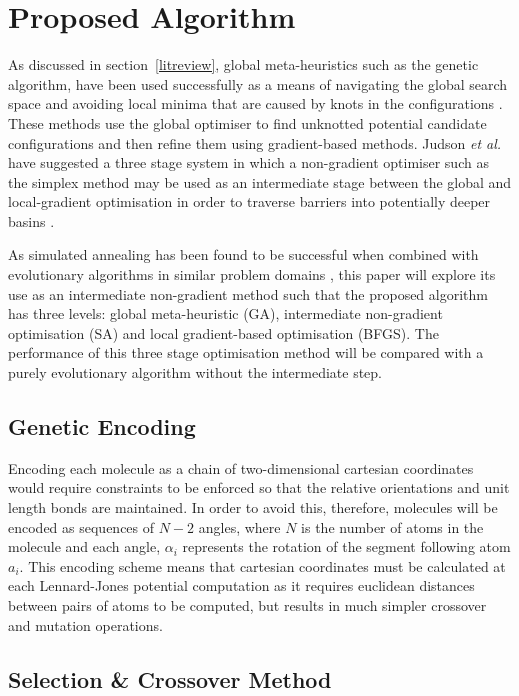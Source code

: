 \documentclass{article}
\begin{document}
\section{Proposed Algorithm} \label{proposed}

As discussed in section~\ref{litreview}, global meta-heuristics such as the
genetic algorithm, have been used successfully as a means of navigating the
global search space and avoiding local minima that are caused by knots in the
configurations \cite{PULLAN1998331, doi:10.1002/qua.560440214}. These methods
use the global optimiser to find unknotted potential candidate configurations
and then refine them using gradient-based methods. Judson \textit{et al.} have
suggested a three stage system in which a non-gradient optimiser such as the
simplex method may be used as an intermediate stage between the global and
local-gradient optimisation in order to traverse barriers into potentially
deeper basins \cite{doi:10.1002/qua.560440214}.

As simulated annealing has been found to be successful when combined with
evolutionary algorithms in similar problem domains \cite{PhysRevLett.91.080201},
this paper will explore its use as an intermediate non-gradient method such that
the proposed algorithm has three levels: global meta-heuristic (GA),
intermediate non-gradient optimisation (SA) and local gradient-based
optimisation (BFGS). The performance of this three stage optimisation method
will be compared with a purely evolutionary algorithm without the intermediate
step.

\subsection{Genetic Encoding}

Encoding each  molecule as a chain of two-dimensional cartesian coordinates
would require constraints to be enforced so that the relative orientations and
unit length bonds are maintained. In order to avoid this, therefore, molecules
will be encoded as sequences of $N-2$ angles, where $N$ is the number of atoms
in the molecule and each angle, $\alpha_i$ represents the rotation of the
segment following atom $a_i$. This encoding scheme means that cartesian
coordinates must be calculated at each Lennard-Jones potential computation as it
requires euclidean distances between pairs of atoms to be computed, but results
in much simpler crossover and mutation operations.

\subsection{Selection \& Crossover Method}
\end{document}
